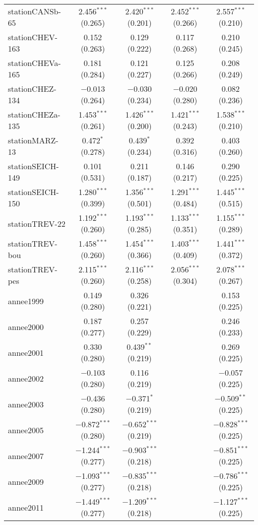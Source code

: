 \begin{table}[!htbp]
\begin{tabular}{@{\extracolsep{5pt}}lcccc}
  stationCANSb-65 & 2.456$^{***}$ (0.265) & 2.420$^{***}$ (0.201) & 2.452$^{***}$ (0.266) & 2.557$^{***}$ (0.210) \\ 
  stationCHEV-163 & 0.152 (0.263) & 0.129 (0.222) & 0.117 (0.268) & 0.210 (0.245) \\ 
  stationCHEVa-165 & 0.181 (0.284) & 0.121 (0.227) & 0.125 (0.266) & 0.208 (0.249) \\ 
  stationCHEZ-134 & $-$0.013 (0.264) & $-$0.030 (0.234) & $-$0.020 (0.280) & 0.082 (0.236) \\ 
  stationCHEZa-135 & 1.453$^{***}$ (0.261) & 1.426$^{***}$ (0.200) & 1.421$^{***}$ (0.243) & 1.538$^{***}$ (0.210) \\ 
  stationMARZ-13 & 0.472$^{*}$ (0.278) & 0.439$^{*}$ (0.234) & 0.392 (0.316) & 0.403 (0.260) \\ 
  stationSEICH-149 & 0.101 (0.531) & 0.211 (0.187) & 0.146 (0.217) & 0.290 (0.225) \\ 
  stationSEICH-150 & 1.280$^{***}$ (0.399) & 1.356$^{***}$ (0.501) & 1.291$^{***}$ (0.484) & 1.445$^{***}$ (0.515) \\ 
  stationTREV-22 & 1.192$^{***}$ (0.260) & 1.193$^{***}$ (0.285) & 1.133$^{***}$ (0.351) & 1.155$^{***}$ (0.289) \\ 
  stationTREV-bou & 1.458$^{***}$ (0.260) & 1.454$^{***}$ (0.366) & 1.403$^{***}$ (0.409) & 1.441$^{***}$ (0.372) \\ 
  stationTREV-pes & 2.115$^{***}$ (0.260) & 2.116$^{***}$ (0.258) & 2.056$^{***}$ (0.304) & 2.078$^{***}$ (0.267) \\ 
  annee1999 & 0.149 (0.280) & 0.326 (0.221) &  & 0.153 (0.225) \\ 
  annee2000 & 0.187 (0.277) & 0.257 (0.229) &  & 0.246 (0.233) \\ 
  annee2001 & 0.330 (0.280) & 0.439$^{**}$ (0.219) &  & 0.269 (0.225) \\ 
  annee2002 & $-$0.103 (0.280) & 0.116 (0.219) &  & $-$0.057 (0.225) \\ 
  annee2003 & $-$0.436 (0.280) & $-$0.371$^{*}$ (0.219) &  & $-$0.509$^{**}$ (0.225) \\ 
  annee2005 & $-$0.872$^{***}$ (0.280) & $-$0.652$^{***}$ (0.219) &  & $-$0.828$^{***}$ (0.225) \\ 
  annee2007 & $-$1.244$^{***}$ (0.277) & $-$0.903$^{***}$ (0.218) &  & $-$0.851$^{***}$ (0.225) \\ 
  annee2009 & $-$1.093$^{***}$ (0.277) & $-$0.835$^{***}$ (0.218) &  & $-$0.786$^{***}$ (0.225) \\ 
  annee2011 & $-$1.449$^{***}$ (0.277) & $-$1.209$^{***}$ (0.218) &  & $-$1.127$^{***}$ (0.225) \\ 

\end{tabular}
\end{table}
